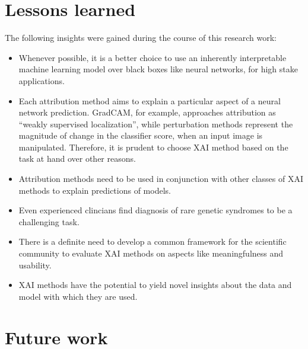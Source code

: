 \documentclass[../report.tex]{subfiles}
\begin{document}
	\section{Lessons learned}
	The following insights were gained during the course of this research work:
	\begin{itemize}
	\item Whenever possible, it is a better choice to use an inherently interpretable machine learning model over black boxes like neural networks, for high stake applications.
	\item Each attribution method aims to explain a particular aspect of a neural network prediction. GradCAM, for example, approaches attribution as \enquote{weakly supervised localization}, while perturbation methods represent the magnitude of change in the classifier score, when an input image is manipulated. Therefore, it is prudent to choose XAI method based on the task at hand over other reasons.
	\item Attribution methods need to be used in conjunction with other classes of XAI methods to explain predictions of models. 
	\item Even experienced clincians find diagnosis of rare genetic syndromes to be a challenging task.
	
	\item There is a definite need to develop a common framework for the scientific community to evaluate XAI methods on aspects like meaningfulness and usability.
	
	\item XAI methods have the potential to yield novel insights about the data and model with which they are used.
	\end{itemize}
    \section{Future work}
\end{document}
